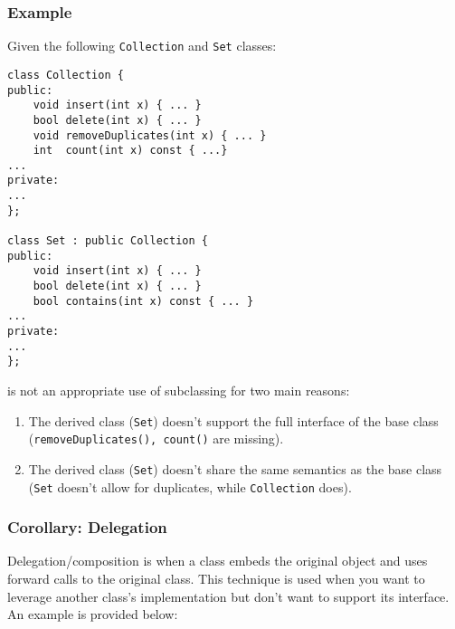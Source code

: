 \documentclass{article}
\begin{document}
\subsubsection*{Example}
Given the following \texttt{Collection} and \texttt{Set} classes:
\begin{verbatim}
class Collection {
public:
    void insert(int x) { ... }
    bool delete(int x) { ... }
    void removeDuplicates(int x) { ... }
    int  count(int x) const { ...}
...
private:
...
};

class Set : public Collection {
public:
    void insert(int x) { ... }
    bool delete(int x) { ... }
    bool contains(int x) const { ... }
...
private:
...
};
\end{verbatim}
is not an appropriate use of subclassing for two main reasons:
\begin{enumerate}[label=(\roman*)]
\item The derived class (\texttt{Set}) doesn't support the full
  interface of the base class (\texttt{removeDuplicates(), count()}
  are missing).
\item The derived class (\texttt{Set}) doesn't share the same
  semantics as the base class (\texttt{Set} doesn't allow for
  duplicates, while \texttt{Collection} does).
\end{enumerate}

\subsubsection*{Corollary: Delegation}
Delegation/composition is when a class embeds the original object and
uses forward calls to the original class. This technique is used when
you want to leverage another class's implementation but don't want to
support its interface. An example is provided below:
\end{document}
